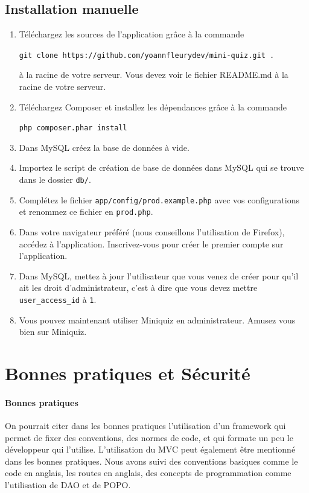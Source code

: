 \documentclass[12pt]{article}
\begin{document}
    \subsection{Installation manuelle}
    \begin{enumerate}
        \item Téléchargez les sources de l'application grâce à la commande
        \begin{center}
            \texttt{git  clone https://github.com/yoannfleurydev/mini-quiz.git .}
        \end{center} 
        à la racine de votre serveur. Vous devez voir le fichier README.md à la racine de votre serveur. 
        \item Téléchargez Composer et installez les dépendances grâce à la commande 
        \begin{center}
            \texttt{php composer.phar install}
        \end{center}
        \item Dans MySQL créez la base de données à vide.
        \item Importez le script de création de base de données dans MySQL qui se trouve dans le dossier \texttt{db/}.
        \item Complétez le fichier \texttt{app/config/prod.example.php} avec vos configurations et renommez ce fichier en \texttt{prod.php}.
        \item Dans votre navigateur préféré (nous conseillons l'utilisation de Firefox), accédez à l'application. Inscrivez-vous pour créer le premier compte sur l'application. 
        \item Dans MySQL, mettez à jour l'utilisateur que vous venez de créer pour qu'il ait les droit d'administrateur, c'est à dire que vous devez mettre \texttt{user\_access\_id} à \texttt{1}.
        \item Vous pouvez maintenant utiliser Miniquiz en administrateur. Amusez vous bien sur Miniquiz.
    \end{enumerate}

\section{Bonnes pratiques et Sécurité}
    \paragraph{Bonnes pratiques} On pourrait citer dans les bonnes pratiques l'utilisation d'un framework qui permet de fixer des conventions, des normes de code, et qui formate un peu le développeur qui l'utilise. L'utilisation du MVC peut également être mentionné dans les bonnes pratiques. Nous avons suivi des conventions basiques comme le code en anglais, les routes en anglais, des concepts de programmation comme l'utilisation de DAO et de POPO.
\end{document}
